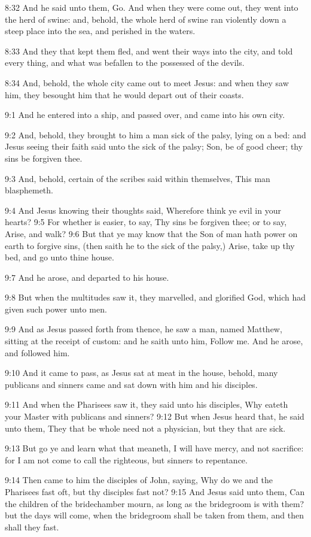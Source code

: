 8:32 And he said unto them, Go. And when they were come out, they went into the herd of swine: and, behold, the whole herd of swine ran violently down a steep place into the sea, and perished in the waters.

8:33 And they that kept them fled, and went their ways into the city, and told every thing, and what was befallen to the possessed of the devils.

8:34 And, behold, the whole city came out to meet Jesus: and when they saw him, they besought him that he would depart out of their coasts.

9:1 And he entered into a ship, and passed over, and came into his own city.

9:2 And, behold, they brought to him a man sick of the palsy, lying on a bed: and Jesus seeing their faith said unto the sick of the palsy; Son, be of good cheer; thy sins be forgiven thee.

9:3 And, behold, certain of the scribes said within themselves, This man blasphemeth.

9:4 And Jesus knowing their thoughts said, Wherefore think ye evil in your hearts?  9:5 For whether is easier, to say, Thy sins be forgiven thee; or to say, Arise, and walk?  9:6 But that ye may know that the Son of man hath power on earth to forgive sins, (then saith he to the sick of the palsy,) Arise, take up thy bed, and go unto thine house.

9:7 And he arose, and departed to his house.

9:8 But when the multitudes saw it, they marvelled, and glorified God, which had given such power unto men.

9:9 And as Jesus passed forth from thence, he saw a man, named Matthew, sitting at the receipt of custom: and he saith unto him, Follow me. And he arose, and followed him.

9:10 And it came to pass, as Jesus sat at meat in the house, behold, many publicans and sinners came and sat down with him and his disciples.

9:11 And when the Pharisees saw it, they said unto his disciples, Why eateth your Master with publicans and sinners?  9:12 But when Jesus heard that, he said unto them, They that be whole need not a physician, but they that are sick.

9:13 But go ye and learn what that meaneth, I will have mercy, and not sacrifice: for I am not come to call the righteous, but sinners to repentance.

9:14 Then came to him the disciples of John, saying, Why do we and the Pharisees fast oft, but thy disciples fast not?  9:15 And Jesus said unto them, Can the children of the bridechamber mourn, as long as the bridegroom is with them? but the days will come, when the bridegroom shall be taken from them, and then shall they fast.

